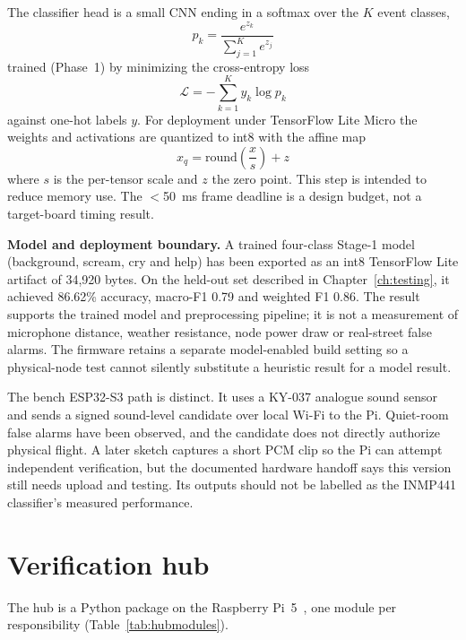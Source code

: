 \documentclass[12pt,a4paper]{report}
\begin{document}
The classifier head is a small CNN ending in a softmax over the $K$
event classes,
\begin{equation}
\label{eq:softmax}
p_k = \frac{e^{z_k}}{\sum_{j=1}^{K} e^{z_j}}
\end{equation}
trained (Phase~1) by minimizing the cross-entropy loss
\begin{equation}
\label{eq:xent}
\mathcal{L} = -\sum_{k=1}^{K} y_k \log p_k
\end{equation}
against one-hot labels $y$. For deployment under TensorFlow Lite Micro
the weights and activations are quantized to int8 with the affine map
\begin{equation}
\label{eq:quant}
x_q = \mathrm{round}\!\left(\frac{x}{s}\right) + z
\end{equation}
where $s$ is the per-tensor scale and $z$ the zero point. This step
is intended to reduce memory use. The $<$50~ms frame deadline is
a design budget, not a target-board timing result.

\textbf{Model and deployment boundary.} A trained four-class Stage-1
model (background, scream, cry and help) has been exported as an int8
TensorFlow Lite artifact of 34,920 bytes. On the held-out set described
in Chapter~\ref{ch:testing}, it achieved 86.62\% accuracy, macro-F1
0.79 and weighted F1 0.86. The result supports the trained model and
preprocessing pipeline; it is not a measurement of microphone distance,
weather resistance, node power draw or real-street false alarms. The
firmware retains a separate model-enabled build setting
so a physical-node test cannot silently substitute a heuristic result
for a model result.

The bench ESP32-S3 path is distinct. It uses a KY-037 analogue sound
sensor and sends a signed sound-level candidate over local Wi-Fi to
the Pi. Quiet-room false alarms have been observed, and the candidate
does not directly authorize physical flight. A later sketch captures
a short PCM clip so the Pi can attempt independent verification, but
the documented hardware handoff says this version still needs upload
and testing. Its outputs should not be labelled as the INMP441
classifier's measured performance.

\section{Verification hub}
\label{sec:hubservice}

The hub is a Python package on the Raspberry Pi~5~\cite{rpi5}, one
module per responsibility (Table~\ref{tab:hubmodules}).
\end{document}
